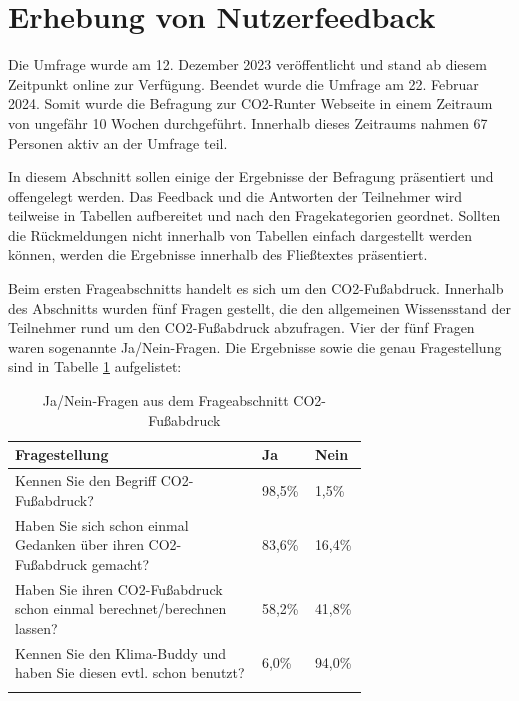 \section{Erhebung von Nutzerfeedback}

Die Umfrage wurde am 12. Dezember 2023 veröffentlicht und stand ab diesem Zeitpunkt online zur Verfügung.
Beendet wurde die Umfrage am 22. Februar 2024.
Somit wurde die Befragung zur CO2-Runter Webseite in einem Zeitraum von ungefähr 10 Wochen durchgeführt.
Innerhalb dieses Zeitraums nahmen 67 Personen aktiv an der Umfrage teil.

In diesem Abschnitt sollen einige der Ergebnisse der Befragung präsentiert und offengelegt werden.
Das Feedback und die Antworten der Teilnehmer wird teilweise in Tabellen aufbereitet und nach den Fragekategorien geordnet.
Sollten die Rückmeldungen nicht innerhalb von Tabellen einfach dargestellt werden können, werden die Ergebnisse innerhalb des Fließtextes präsentiert.

Beim ersten Frageabschnitts handelt es sich um den CO2-Fußabdruck.
Innerhalb des Abschnitts wurden fünf Fragen gestellt, die den allgemeinen Wissensstand der Teilnehmer rund um den CO2-Fußabdruck abzufragen.
Vier der fünf Fragen waren sogenannte Ja/Nein-Fragen.
Die Ergebnisse sowie die genau Fragestellung sind in Tabelle \ref{co2fußabdruckfragen} aufgelistet: \newline

\begin{longtable}{|p{0.7\linewidth}|l|l|}
    \hline
    \textbf{Fragestellung}                                                  & \textbf{Ja} & \textbf{Nein} \\ \hline
    \endfirsthead

    Kennen Sie den Begriff CO2-Fußabdruck?                                  & 98,5\%      & 1,5\%         \\ \hline
    Haben Sie sich schon einmal Gedanken über ihren CO2-Fußabdruck gemacht? & 83,6\%      & 16,4\%        \\ \hline
    Haben Sie ihren CO2-Fußabdruck schon einmal berechnet/berechnen lassen? & 58,2\%      & 41,8\%        \\ \hline
    Kennen Sie den Klima-Buddy und haben Sie diesen evtl. schon benutzt?    & 6,0\%       & 94,0\%        \\ \hline
    \caption{Ja/Nein-Fragen aus dem Frageabschnitt CO2-Fußabdruck}
    \label{co2fußabdruckfragen}
    \\
\end{longtable}

